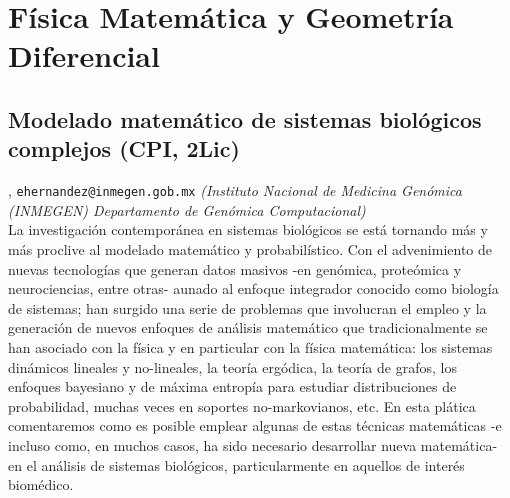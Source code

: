 \section{F\'isica Matem\'atica y Geometr\'ia Diferencial}

\subsection{\sffamily Modelado matem\'atico de sistemas biol\'ogicos complejos {\footnotesize (CPI, 2Lic)}} \label{reg-1514} 
, {\tt ehernandez@inmegen.gob.mx}  {\slshape (Instituto Nacional de Medicina Gen\'omica (INMEGEN) Departamento de Gen\'omica Computacional)}\\
          \noindent La investigaci\'on contempor\'anea en sistemas biol\'ogicos se est\'a tornando m\'as y m\'as proclive al modelado matem\'atico y probabil\'istico. Con el advenimiento de nuevas tecnolog\'ias que generan datos masivos -en gen\'omica, prote\'omica y neurociencias, entre otras- aunado al enfoque integrador conocido como biolog\'ia de sistemas; han surgido una serie de problemas que involucran el empleo y la generaci\'on de nuevos enfoques de an\'alisis matem\'atico que tradicionalmente se han asociado con la f\'isica y en particular con la f\'isica matem\'atica: los sistemas din\'amicos lineales y no-lineales, la teor\'ia erg\'odica, la teor\'ia de grafos, los enfoques bayesiano y de m\'axima entrop\'ia para estudiar distribuciones de probabilidad, muchas veces en soportes no-markovianos, etc. En esta pl\'atica comentaremos como es posible emplear algunas de estas t\'ecnicas matem\'aticas -e incluso como, en muchos casos, ha sido necesario desarrollar nueva matem\'atica- en el an\'alisis de sistemas biol\'ogicos, particularmente en aquellos de inter\'es biom\'edico.
